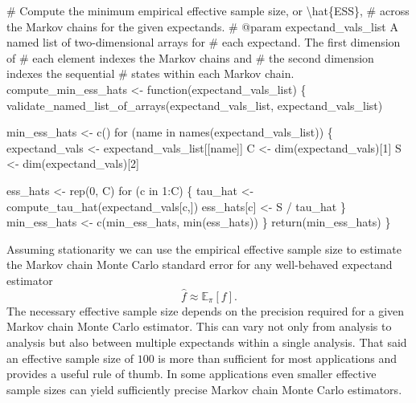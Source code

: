 \documentclass[
  letterpaper,
  DIV=11,
  numbers=noendperiod]{scrartcl}
\newenvironment{Shaded}{\begin{snugshade}}{\end{snugshade}}
\newcommand{\BuiltInTok}[1]{\textcolor[rgb]{0.00,0.23,0.31}{#1}}
\newcommand{\CommentTok}[1]{\textcolor[rgb]{0.37,0.37,0.37}{#1}}
\newcommand{\ControlFlowTok}[1]{\textcolor[rgb]{0.00,0.23,0.31}{#1}}
\newcommand{\DecValTok}[1]{\textcolor[rgb]{0.68,0.00,0.00}{#1}}
\newcommand{\KeywordTok}[1]{\textcolor[rgb]{0.00,0.23,0.31}{#1}}
\newcommand{\NormalTok}[1]{\textcolor[rgb]{0.00,0.23,0.31}{#1}}
\newcommand{\OperatorTok}[1]{\textcolor[rgb]{0.37,0.37,0.37}{#1}}
\newcommand{\StringTok}[1]{\textcolor[rgb]{0.13,0.47,0.30}{#1}}
\begin{document}
\begin{Shaded}
\begin{Highlighting}[]
\CommentTok{\# Compute the minimum empirical effective sample size, or \textbackslash{}hat\{ESS\},}
\CommentTok{\# across the Markov chains for the given expectands.}
\CommentTok{\# @param expectand\_vals\_list A named list of two{-}dimensional arrays for}
\CommentTok{\#                            each expectand.  The first dimension of}
\CommentTok{\#                            each element indexes the Markov chains and}
\CommentTok{\#                            the second dimension indexes the sequential}
\CommentTok{\#                            states within each Markov chain.}
\NormalTok{compute\_min\_ess\_hats }\OperatorTok{\textless{}{-}}\NormalTok{ function(expectand\_vals\_list) \{}
\NormalTok{  validate\_named\_list\_of\_arrays(expectand\_vals\_list,}
                                \StringTok{\textquotesingle{}expectand\_vals\_list\textquotesingle{}}\NormalTok{)}

\NormalTok{  min\_ess\_hats }\OperatorTok{\textless{}{-}}\NormalTok{ c()}
  \ControlFlowTok{for}\NormalTok{ (name }\KeywordTok{in}\NormalTok{ names(expectand\_vals\_list)) \{}
\NormalTok{    expectand\_vals }\OperatorTok{\textless{}{-}}\NormalTok{ expectand\_vals\_list[[name]]}
\NormalTok{    C }\OperatorTok{\textless{}{-}}\NormalTok{ dim(expectand\_vals)[}\DecValTok{1}\NormalTok{]}
\NormalTok{    S }\OperatorTok{\textless{}{-}}\NormalTok{ dim(expectand\_vals)[}\DecValTok{2}\NormalTok{]}
    
\NormalTok{    ess\_hats }\OperatorTok{\textless{}{-}}\NormalTok{ rep(}\DecValTok{0}\NormalTok{, C)}
    \ControlFlowTok{for}\NormalTok{ (c }\KeywordTok{in} \DecValTok{1}\NormalTok{:C) \{}
\NormalTok{      tau\_hat }\OperatorTok{\textless{}{-}}\NormalTok{ compute\_tau\_hat(expectand\_vals[c,])}
\NormalTok{      ess\_hats[c] }\OperatorTok{\textless{}{-}}\NormalTok{ S }\OperatorTok{/}\NormalTok{ tau\_hat}
\NormalTok{    \}}
\NormalTok{    min\_ess\_hats }\OperatorTok{\textless{}{-}}\NormalTok{ c(min\_ess\_hats, }\BuiltInTok{min}\NormalTok{(ess\_hats))}
\NormalTok{  \}}
  \ControlFlowTok{return}\NormalTok{(min\_ess\_hats)}
\NormalTok{\}}
\end{Highlighting}
\end{Shaded}

Assuming stationarity we can use the empirical effective sample size to
estimate the Markov chain Monte Carlo standard error for any
well-behaved expectand estimator \[
\hat{f} \approx \mathbb{E}_{\pi}[f].
\] The necessary effective sample size depends on the precision required
for a given Markov chain Monte Carlo estimator. This can vary not only
from analysis to analysis but also between multiple expectands within a
single analysis. That said an effective sample size of \(100\) is more
than sufficient for most applications and provides a useful rule of
thumb. In some applications even smaller effective sample sizes can
yield sufficiently precise Markov chain Monte Carlo estimators.
\end{document}
